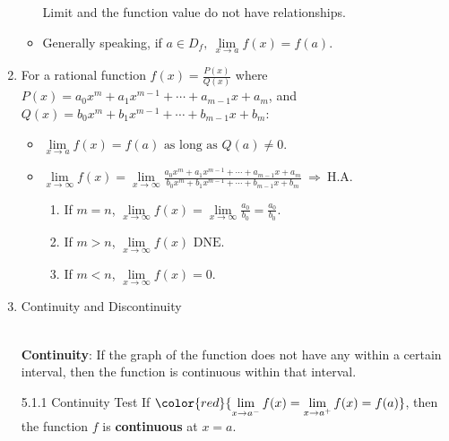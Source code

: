 \documentclass[12pt, a4paper]{article}
\begin{document}
\begin{enumerate}
\begin{itemize}
        Limit and the function value do not have relationships.
        \item Generally speaking, if $a \in D_f,\ \lim\limits_{x\rightarrow a}f(x)=f(a)$.
    \end{itemize}
    \item For a rational function $f(x)=\frac{P(x)}{Q(x)}$ where $P(x)=a_0x^m+a_1x^{m-1}+\cdots+a_{m-1}x+a_m$, and $Q(x)=b_0x^m+b_1x^{m-1}+\cdots+b_{m-1}x+b_m$:
    \begin{itemize}
        \item $\lim\limits_{x\rightarrow a}f(x)=f(a)\text{ as long as }Q(a)\neq 0.$
        \item $\lim\limits_{x\rightarrow \infty}f(x)=\lim\limits_{x\rightarrow \infty}\frac{a_0x^m+a_1x^{m-1}+\cdots+a_{m-1}x+a_m}{b_0x^m+b_1x^{m-1}+\cdots+b_{m-1}x+b_m}\ \Rightarrow\ \text{H.A.}$
        \begin{enumerate}
            \item If $m=n$, $\lim\limits_{x\rightarrow \infty}f(x)=\lim\limits_{x\rightarrow \infty}\frac{a_0}{b_0}=\frac{a_0}{b_0}.$
            \item If $m>n$, $\lim\limits_{x\rightarrow \infty}f(x)\text{ DNE.}$
            \item If $m<n$, $\lim\limits_{x\rightarrow \infty}f(x)=0.$
        \end{enumerate}
    \end{itemize}
    \item Continuity and Discontinuity
    \begin{myclaim}{ }{}
        \\{\color{red}\textbf{Continuity}}: If the graph of the function does not have any {\color{red}{breaks or holes}} within a certain interval, then the function is continuous within that interval.
    \end{myclaim}
    \begin{theorem}{5.1.1 Continuity Test}{}
        If ${\color{red}{\lim\limits_{x\rightarrow a^-}f(x)=\lim\limits_{x\rightarrow a^+}f(x)=f(a)}}$, then the function $f$ is \textbf{continuous} at $x=a$.
    \end{theorem}
\end{enumerate}
\end{document}

